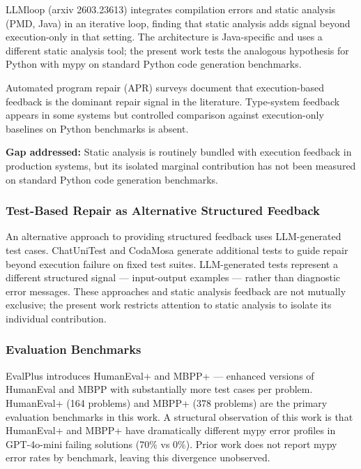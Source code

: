 LLMloop (arxiv 2603.23613) integrates compilation errors and static analysis (PMD, Java) in an iterative loop, finding that static analysis adds signal beyond execution-only in that setting. The architecture is Java-specific and uses a different static analysis tool; the present work tests the analogous hypothesis for Python with mypy on standard Python code generation benchmarks.

Automated program repair (APR) surveys \citep{Xia2023Automated} document that execution-based feedback is the dominant repair signal in the literature. Type-system feedback appears in some systems but controlled comparison against execution-only baselines on Python benchmarks is absent.

\textbf{Gap addressed:} Static analysis is routinely bundled with execution feedback in production systems, but its isolated marginal contribution has not been measured on standard Python code generation benchmarks.

\subsubsection{Test-Based Repair as Alternative Structured Feedback}

An alternative approach to providing structured feedback uses LLM-generated test cases. ChatUniTest and CodaMosa generate additional tests to guide repair beyond execution failure on fixed test suites. LLM-generated tests represent a different structured signal --- input-output examples --- rather than diagnostic error messages. These approaches and static analysis feedback are not mutually exclusive; the present work restricts attention to static analysis to isolate its individual contribution.

\subsubsection{Evaluation Benchmarks}

EvalPlus \citep{Liu2023EvalPlus} introduces HumanEval+ and MBPP+ --- enhanced versions of HumanEval \citep{Chen2021Evaluating} and MBPP \citep{Austin2021Program} with substantially more test cases per problem. HumanEval+ (164 problems) and MBPP+ (378 problems) are the primary evaluation benchmarks in this work. A structural observation of this work is that HumanEval+ and MBPP+ have dramatically different mypy error profiles in GPT-4o-mini failing solutions (70\% vs 0\%). Prior work does not report mypy error rates by benchmark, leaving this divergence unobserved.

